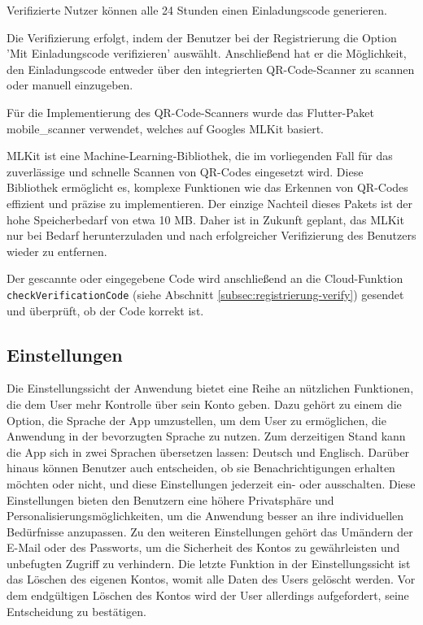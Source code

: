Verifizierte Nutzer können alle 24 Stunden einen
Einladungscode generieren.

Die Verifizierung erfolgt, indem der Benutzer bei der
Registrierung die Option 'Mit Einladungscode verifizieren'
auswählt. Anschließend hat er die Möglichkeit, den
Einladungscode entweder über den integrierten
QR-Code-Scanner zu scannen oder manuell einzugeben.


Für die
Implementierung des QR-Code-Scanners wurde das Flutter-Paket
\cite{mobile_scanner} mobile\_scanner
verwendet, welches auf Googles MLKit \cite{googlemlkit}
basiert.

MLKit ist eine Machine-Learning-Bibliothek, die im
vorliegenden Fall für das zuverlässige und schnelle Scannen
von QR-Codes eingesetzt wird.
Diese Bibliothek ermöglicht es, komplexe Funktionen wie das Erkennen von QR-Codes effizient und präzise zu implementieren. Der einzige Nachteil dieses Pakets ist der hohe Speicherbedarf von etwa 10 MB. Daher ist in Zukunft geplant, das MLKit nur bei Bedarf herunterzuladen und nach erfolgreicher Verifizierung des Benutzers wieder zu entfernen.

Der gescannte oder eingegebene Code wird anschließend an die Cloud-Funktion \texttt{checkVerificationCode} (siehe Abschnitt \ref{subsec:registrierung-verify}) gesendet und überprüft, ob der Code korrekt ist.



\subsection{Einstellungen}
Die Einstellungssicht der Anwendung bietet eine Reihe an nützlichen Funktionen, die dem User mehr Kontrolle über sein Konto geben.
Dazu gehört zu einem die Option, die Sprache der App umzustellen, um dem User zu ermöglichen, die Anwendung in der bevorzugten Sprache zu nutzen. Zum derzeitigen Stand kann die App sich in zwei Sprachen übersetzen lassen: Deutsch und Englisch.
Darüber hinaus können Benutzer auch entscheiden, ob sie Benachrichtigungen erhalten möchten oder nicht, und diese Einstellungen jederzeit ein- oder ausschalten. Diese Einstellungen bieten den Benutzern eine höhere Privatsphäre und Personalisierungsmöglichkeiten, um die Anwendung besser an ihre individuellen Bedürfnisse anzupassen.
Zu den weiteren Einstellungen gehört das Umändern der E-Mail oder des Passworts, um die Sicherheit des Kontos zu gewährleisten und unbefugten Zugriff zu verhindern.
Die letzte Funktion in der Einstellungssicht ist das Löschen des eigenen Kontos, womit alle Daten des Users gelöscht werden. Vor dem endgültigen Löschen des Kontos wird der User allerdings aufgefordert, seine Entscheidung zu bestätigen.

